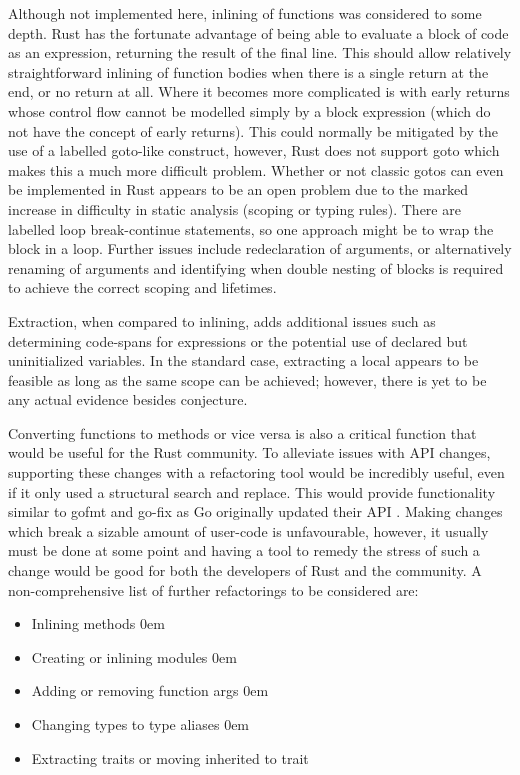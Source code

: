 Although not implemented here, inlining of functions was considered to some depth. Rust has the fortunate advantage of being able to evaluate a block of code as an expression, returning the result of the final line. This should allow relatively straightforward inlining of function bodies when there is a single return at the end, or no return at all. Where it becomes more complicated is with early returns whose control flow cannot be modelled simply by a block expression (which do not have the concept of early returns). This could normally be mitigated by the use of a labelled goto-like construct, however, Rust does not support goto which makes this a much more difficult problem. Whether or not classic gotos can even be implemented in Rust appears to be an open problem due to the marked increase in difficulty in static analysis (scoping or typing rules). There are labelled loop break-continue statements, so one approach might be to wrap the block in a loop. Further issues include redeclaration of arguments, or alternatively renaming of arguments and identifying when double nesting of blocks is required to achieve the correct scoping and lifetimes. 

Extraction, when compared to inlining, adds additional issues such as determining code-spans for expressions or the potential use of declared but uninitialized variables. In the standard case, extracting a local appears to be feasible as long as the same scope can be achieved; however, there is yet to be any actual evidence besides conjecture.

Converting functions to methods or vice versa is also a critical function that would be useful for the Rust community. To alleviate issues with API changes, supporting these changes with a refactoring tool would be incredibly useful, even if it only used a structural search and replace. This would provide functionality similar to gofmt and go-fix as Go originally updated their API \cite{gofix11}. Making changes which break a sizable amount of user-code is unfavourable, however, it usually must be done at some point and having a tool to remedy the stress of such a change would be good for both the developers of Rust and the community. A non-comprehensive list of further refactorings to be considered are:

\begin{multicols}{2}
\begin{itemize}
\item Inlining methods
\itemsep0em 
\item Creating or inlining modules
\itemsep0em 
\item Adding or removing function args
\itemsep0em 
\item Changing types to type aliases
\itemsep0em 
\item Extracting traits or moving inherited to trait
\end{itemize}
\end{multicols}

